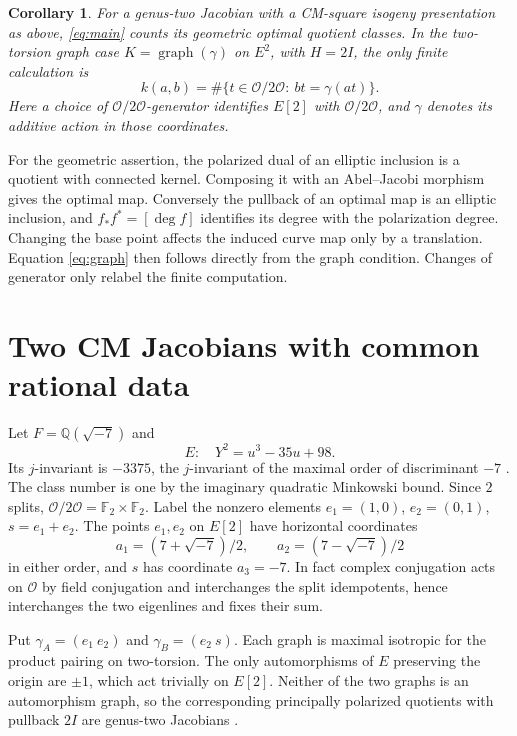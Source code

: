 \documentclass[11pt,letterpaper]{amsart}
\newtheorem{corollary}[theorem]{Corollary}
\theoremstyle{definition}
\numberwithin{equation}{section}
\newcommand{\Q}{\mathbb Q}
\newcommand{\OO}{\mathcal O}
\begin{document}
\begin{corollary}\label{cor:surface}
For a genus-two Jacobian with a CM-square isogeny presentation as
above, \eqref{eq:main} counts its geometric optimal quotient classes.
In the two-torsion graph case \(K=\operatorname{graph}(\gamma)\)
on \(E^2\), with \(H=2I\), the only finite calculation is
\begin{equation}\label{eq:graph}
 k(a,b)=\#\{t\in\OO/2\OO:\ bt=\gamma(at)\}.
\end{equation}
Here a choice of \(\OO/2\OO\)-generator identifies \(E[2]\) with
\(\OO/2\OO\), and \(\gamma\) denotes its additive action in those
coordinates.
\end{corollary}

For the geometric assertion, the polarized dual of an elliptic
inclusion is a quotient with connected kernel. Composing it with
an Abel--Jacobi morphism gives the optimal map. Conversely the
pullback of an optimal map is an elliptic inclusion, and
\(f_*f^*=[\deg f]\) identifies its degree with the polarization
degree. Changing the base point affects the induced curve map only
by a translation. Equation \eqref{eq:graph} then follows directly
from the graph condition. Changes of generator only relabel the
finite computation.

\section{Two CM Jacobians with common rational data}\label{sec:minus7}

Let \(F=\Q(\sqrt{-7})\) and
\[
  E:\quad Y^2=u^3-35u+98.
\]
Its \(j\)-invariant is \(-3375\), the \(j\)-invariant of the maximal
order of discriminant \(-7\) \cite{Cox}. The class number is one
by the imaginary quadratic Minkowski bound. Since \(2\) splits,
\(\OO/2\OO=\mathbb F_2\times\mathbb F_2\). Label the nonzero
elements \(e_1=(1,0)\), \(e_2=(0,1)\), \(s=e_1+e_2\).
The points \(e_1,e_2\) on \(E[2]\) have horizontal coordinates
\[
 a_1=(7+\sqrt{-7})/2,\qquad a_2=(7-\sqrt{-7})/2
\]
in either order, and \(s\) has coordinate \(a_3=-7\).
In fact complex conjugation acts on \(\OO\) by field conjugation and
interchanges the split idempotents, hence interchanges the two
eigenlines and fixes their sum.

Put \(\gamma_A=(e_1\ e_2)\) and \(\gamma_B=(e_2\ s)\).
Each graph is maximal isotropic for the product pairing on two-torsion.
The only automorphisms of \(E\) preserving the origin are \(\pm1\),
which act trivially on \(E[2]\). Neither of the two graphs is an
automorphism graph, so the corresponding principally polarized
quotients with pullback \(2I\) are genus-two Jacobians
\cite[Proposition 3]{HLP}.
\end{document}

